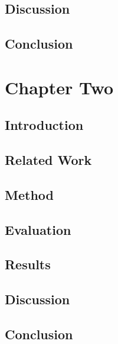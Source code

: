 \documentclass[letterpaper]{tandon_thesis}
\begin{document}
\section{Discussion}\label{sec:ChapOneDiscussion}


\section{Conclusion}\label{sec:ChapOneConclusion}


\chapter{Chapter Two}
\label{ch-2}

\section{Introduction}\label{sec:ChapTwoIntroduction}


\section{Related Work}\label{sec:ChapTwoMotivation}


\section{Method}\label{sec:ChapTwoMethod}


\section{Evaluation}\label{sec:ChapTwoEvaluation}


\section{Results}\label{sec:ChapTwoResults}


\section{Discussion}\label{sec:ChapTwoDiscussion}


\section{Conclusion}\label{sec:ChapTwoConclusion}

\end{document}
